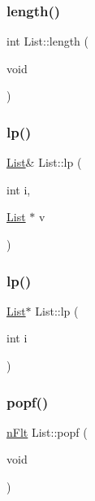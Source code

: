 \mbox{\label{classList_afb8e3165e3c58d1eeaba6c5a53c834fe}} 
\subsubsection{\texorpdfstring{length()}{length()}}
{\footnotesize\ttfamily int List\+::length (\begin{DoxyParamCaption}\item[{void}]{ }\end{DoxyParamCaption})}

\mbox{\label{classList_acdce93b11faf64cde177a58046325de4}} 
\subsubsection{\texorpdfstring{lp()}{lp()}\hspace{0.1cm}{\footnotesize\ttfamily [1/2]}}
{\footnotesize\ttfamily \mbox{\hyperlink{classList}{List}}\& List\+::lp (\begin{DoxyParamCaption}\item[{int}]{i,  }\item[{\mbox{\hyperlink{classList}{List}} $\ast$}]{v }\end{DoxyParamCaption})}

\mbox{\label{classList_a121e2cfbd4adcb0c70436a41a3708aa2}} 
\subsubsection{\texorpdfstring{lp()}{lp()}\hspace{0.1cm}{\footnotesize\ttfamily [2/2]}}
{\footnotesize\ttfamily \mbox{\hyperlink{classList}{List}}$\ast$ List\+::lp (\begin{DoxyParamCaption}\item[{int}]{i }\end{DoxyParamCaption})}

\mbox{\label{classList_a44341a2dcdc2cbdae092e647a3c7e16e}} 
\subsubsection{\texorpdfstring{popf()}{popf()}}
{\footnotesize\ttfamily \mbox{\hyperlink{Node_8h_aa7fdace1cf021510d341a4ce92e2223a}{n\+Flt}} List\+::popf (\begin{DoxyParamCaption}\item[{void}]{ }\end{DoxyParamCaption})}

